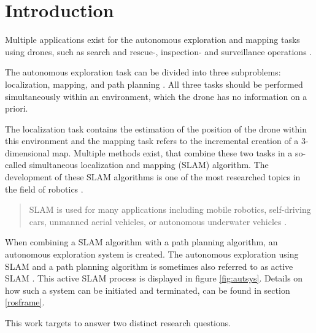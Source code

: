 \chapter{Introduction}

Multiple applications exist for the autonomous exploration and mapping tasks using drones,
 such as search and rescue-, inspection- and surveillance operations \cite{usecases}. 
 
 The autonomous exploration task can be divided into three subproblems: localization, mapping, and path planning \cite{accurat}. 
 All three tasks should be performed simultaneously within an environment, which the drone has no information on a priori. 
 
 The localization task contains the estimation of the position of the drone within this environment and the mapping task refers to 
 the incremental creation of a 3-dimensional map. Multiple methods exist, that combine these two tasks in a so-called 
 simultaneous localization and mapping (SLAM) algorithm. The development of these SLAM algorithms is one of the most researched topics 
in the field of robotics \cite{slamintro}.

\begin{quote}
SLAM is used for many applications including mobile robotics, self-driving cars, unmanned
aerial vehicles, or autonomous underwater vehicles \cite{quote1}.
\end{quote}

 When combining a SLAM algorithm with a path planning algorithm, an autonomous exploration 
system is created. The autonomous exploration using SLAM and a path planning algorithm is sometimes also referred to as active SLAM \cite{inproceedings}. 
This active SLAM process is displayed in figure \ref{fig:autsys}. Details on how such a system can be initiated and terminated, can be found in section 
\ref{rosframe}.
 
 
This work targets to answer two distinct research questions. 
 
